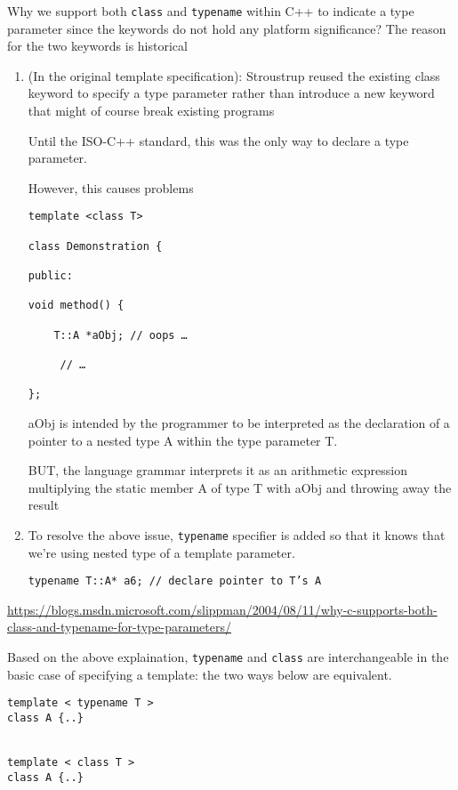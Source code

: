 Why we support both \verb!class! and \verb!typename! within C++ to indicate a type parameter
since the keywords do not hold any platform significance? The reason for the two keywords is historical
\begin{enumerate}
  
  \item (In the original template specification): Stroustrup reused the existing
  class keyword to specify a type parameter rather than introduce a new keyword
  that might of course break existing programs
  
  Until the ISO-C++ standard, this was the only way to declare a type parameter.

  However, this causes problems
\begin{verbatim}
template <class T>

class Demonstration {

public:

void method() {

    T::A *aObj; // oops …

     // …

};
\end{verbatim}

aObj is intended by the programmer to be interpreted as the declaration of a
pointer to a nested type A within the type parameter T. 

BUT,  the language grammar interprets it as an arithmetic expression multiplying
the static member A of type T with aObj and throwing away the result


  \item To resolve the above issue, \verb!typename! specifier is added so that it knows that we're using nested type
  of a template parameter.

\begin{verbatim}
typename T::A* a6; // declare pointer to T’s A
\end{verbatim}
\end{enumerate}
\url{https://blogs.msdn.microsoft.com/slippman/2004/08/11/why-c-supports-both-class-and-typename-for-type-parameters/}


Based on the above explaination, \verb!typename! and \verb!class! are
interchangeable in the basic case of specifying a template: the two ways below
are equivalent.
\begin{lstlisting}
template < typename T >
class A {..}


template < class T >
class A {..}
\end{lstlisting}

